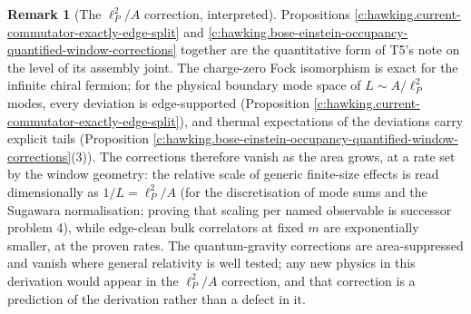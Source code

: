 \documentclass[11pt]{article}
\theoremstyle{definition}
\newtheorem{remark}[theorem]{Remark}
\theoremstyle{plain}
\begin{document}
\begin{remark}[The $\ell_P^2/A$ correction, interpreted]\label{c:note.hawking.p-2-correction-interpreted}
Propositions \ref{c:hawking.current-commutator-exactly-edge-split} and \ref{c:hawking.bose-einstein-occupancy-quantified-window-corrections} together are the quantitative form of T5's note on the level of its assembly joint. The charge-zero Fock isomorphism is exact for the infinite chiral fermion; for the physical boundary mode space of $L \sim A/\ell_P^2$ modes, every deviation is edge-supported (Proposition \ref{c:hawking.current-commutator-exactly-edge-split}), and thermal expectations of the deviations carry explicit tails (Proposition \ref{c:hawking.bose-einstein-occupancy-quantified-window-corrections}(3)). The corrections therefore vanish as the area grows, at a rate set by the window geometry: the relative scale of generic finite-size effects is read dimensionally as $1/L = \ell_P^2/A$ (for the discretisation of mode sums and the Sugawara normalisation; proving that scaling per named observable is successor problem 4), while edge-clean bulk correlators at fixed $m$ are exponentially smaller, at the proven rates. The quantum-gravity corrections are area-suppressed and vanish where general relativity is well tested; any new physics in this derivation would appear in the $\ell_P^2/A$ correction, and that correction is a prediction of the derivation rather than a defect in it.
\end{remark}
\end{document}
